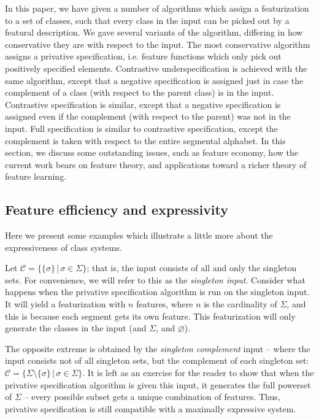 \documentclass[11pt, oneside]{article}   	%
\begin{document}
In this paper, we have given a number of algorithms which assign a featurization to a set of classes, such that every class in the input can be picked out by a featural description. We gave several variants of the algorithm, differing in how conservative they are with respect to the input. The most conservative algorithm assigns a privative specification, i.e. feature functions which only pick out positively specified elements. Contrastive underspecification is achieved with the same algorithm, except that a negative specification is assigned just in case the complement of a class (with respect to the parent class) is in the input. Contrastive specification is similar, except that a negative specification is assigned even if the complement (with respect to the parent) was not in the input. Full specification is similar to contrastive specification, except the complement is taken with respect to the entire segmental alphabet. In this section, we discuss some outstanding issues, such as feature economy, how the current work bears on feature theory, and applications toward a richer theory of feature learning.

\subsection{Feature efficiency and expressivity}

Here we present some examples which illustrate a little more about the expressiveness of class systems.

Let $\mathcal C = \{ \{\sigma\} \, | \, \sigma \in \Sigma \}$; that is, the input consists of all and only the singleton sets. For convenience, we will refer to this as the \textit{singleton input}. Consider what happens when the privative specification algorithm is run on the singleton input. It will yield a featurization with $n$ features, where $n$ is the cardinality of $\Sigma$, and this is because each segment gets its own feature. This featurization will only generate the classes in the input (and $\Sigma$, and $\varnothing$).

The opposite extreme is obtained by the \textit{singleton complement} input -- where the input consists not of all singleton sets, but the complement of each singleton set:  $\mathcal C = \{ \Sigma \setminus \{\sigma\} \, | \, \sigma \in \Sigma \}$. It is left as an exercise for the reader to show that when the privative specification algorithm is given this input, it generates the full powerset of $\Sigma$ -- every possible subset gets a unique combination of features. Thus, privative specification is still compatible with a maximally expressive system.
\end{document}
